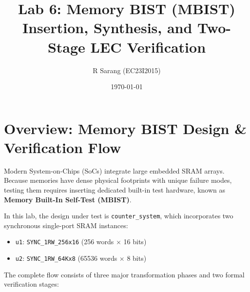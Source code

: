 \documentclass[12pt]{article}
\title{\textbf{Lab 6: Memory BIST (MBIST) Insertion, Synthesis, and Two-Stage LEC Verification}}
\author{R Sarang (EC23I2015)}
\date{\today}
\begin{document}
\maketitle
\tableofcontents
\newpage

\section{Overview: Memory BIST Design \& Verification Flow}

Modern System-on-Chips (SoCs) integrate large embedded SRAM arrays. Because memories have dense physical footprints with unique failure modes, testing them requires inserting dedicated built-in test hardware, known as \textbf{Memory Built-In Self-Test (MBIST)}.

In this lab, the design under test is \texttt{counter\_system}, which incorporates two synchronous single-port SRAM instances:
\begin{itemize}
    \item \texttt{u1}: \texttt{SYNC\_1RW\_256x16} (256 words $\times$ 16 bits)
    \item \texttt{u2}: \texttt{SYNC\_1RW\_64Kx8} (65536 words $\times$ 8 bits)
\end{itemize}

The complete flow consists of three major transformation phases and two formal verification stages:
\end{document}
